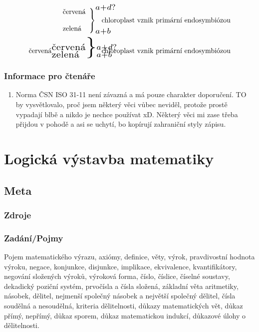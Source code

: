 \documentclass[12pt]{article}
\begin{document}
\begin{align*}
 \left.
    \begin{array}{ll}
       \text{červená} \\
       \\
       \text{zelená}
    \end{array}
\right\}_{\scaleto{a+b}{9pt}}^{\scaleto{a+d?}{9pt}} \mspace{-40mu} \text{chloroplast vznik primární endosymbiózou}\\
       \text{červená}
 {^{\scaleto{\text{červená}}{9pt}}_{\scaleto{\text{zelená}}{9pt}}}\scaleto{ \}}{30pt}
_{\scaleto{a+b}{9pt}}^{\scaleto{a+d?}{9pt}} \mspace{-40mu} \text{chloroplast vznik primární endosymbiózou}
\end{align*} %

\subsubsection{Informace pro čtenáře}
\begin{enumerate}
\item Norma ČSN ISO 31-11 není závazná a má pouze charakter doporučení. TO by vysvětlovalo, proč jsem některý věci vůbec neviděl, protože prostě vypadají blbě a nikdo je nechce používat xD. Některý věci mi zase třeba přijdou v pohodě a asi se uchytí, bo kopírují zahraniční styly zápisu.
\end{enumerate}
\section{Logická výstavba matematiky}

\subsection{Meta}
\subsubsection{Zdroje}
\subsubsection{Zadání/Pojmy}
Pojem matematického výrazu, axiómy, definice, věty, výrok, pravdivostní hodnota výroku, negace, konjunkce, disjunkce, implikace, ekvivalence, kvantifikátory, negování složených výroků, výroková forma, číslo, číslice, číselné soustavy, dekadický poziční systém, prvočísla a čísla složená, základní věta aritmetiky, násobek, dělitel, nejmenší společný násobek a největší společný dělitel, čísla soudělná a nesoudělná, kriteria dělitelnosti, důkazy matematických vět, důkaz přímý, nepřímý, důkaz sporem, důkaz matematickou indukcí, důkazové úlohy o dělitelnosti.
\end{document}

